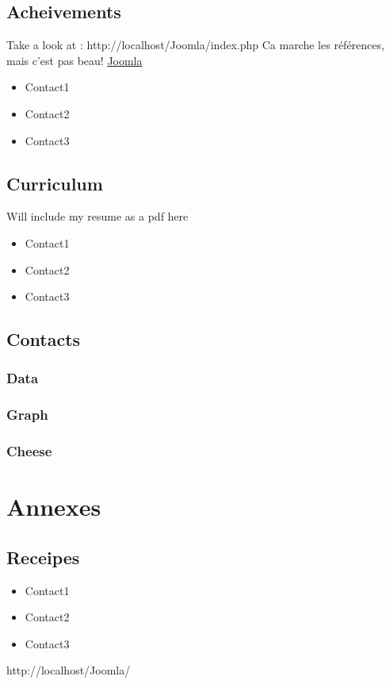\documentclass[8pt]{article} %
\begin{document}
\subsection{Acheivements}

Take a look at : http://localhost/Joomla/index.php
Ca marche les références, mais c'est pas beau!
\href{http://localhost/Joomla/index.php}{Joomla}
\begin{itemize}
  \item Contact1 
  \item Contact2 
  \item Contact3 
\end{itemize}

\subsection{Curriculum}
{\footnotesize
Will include my resume as a pdf here\\
\begin{itemize}
  \item Contact1 
  \item Contact2 
  \item Contact3 
\end{itemize}
}

\subsection{Contacts}

{\footnotesize
\subsubsection{Data}

\subsubsection{Graph}

\subsubsection{Cheese}

}

\section{Annexes}

\subsection{Receipes}
\begin{itemize}
  \item Contact1 
  \item Contact2 
  \item Contact3 
\end{itemize}
http://localhost/Joomla/
\end{document}
